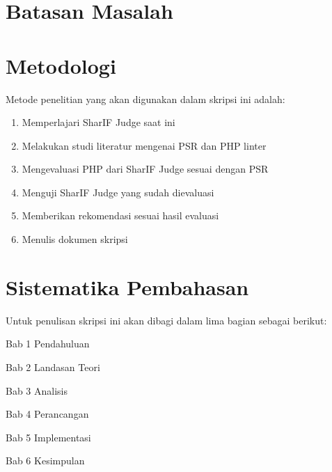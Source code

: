 
\section{Batasan Masalah}
\label{sec:batasan}



\section{Metodologi}
\label{sec:metlit}
Metode penelitian yang akan digunakan dalam skripsi ini adalah:
\begin{enumerate}
	\item Memperlajari SharIF Judge saat ini
	\item Melakukan studi literatur mengenai PSR dan PHP linter
	\item Mengevaluasi PHP dari SharIF Judge sesuai dengan PSR
	\item Menguji SharIF Judge yang sudah dievaluasi
	\item Memberikan rekomendasi sesuai hasil evaluasi
	\item Menulis dokumen skripsi
\end{enumerate}


\section{Sistematika Pembahasan}
\label{sec:sispem}
Untuk penulisan skripsi ini akan dibagi dalam lima bagian sebagai berikut:

Bab 1 Pendahuluan

Bab 2 Landasan Teori 

Bab 3 Analisis

Bab 4 Perancangan

Bab 5 Implementasi

Bab 6 Kesimpulan

